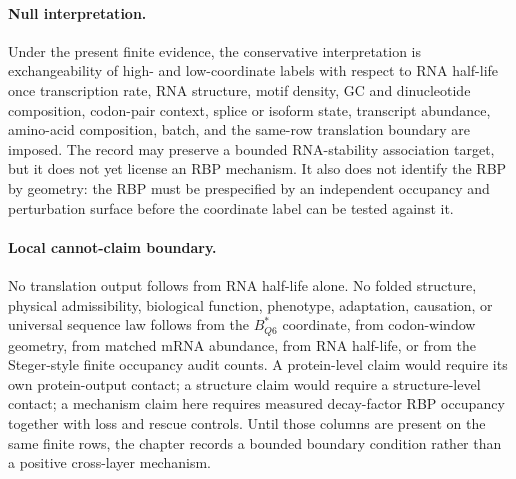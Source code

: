 \paragraph{Null interpretation.}
Under the present finite evidence, the conservative interpretation is exchangeability of high- and low-coordinate labels with respect to RNA half-life once transcription rate, RNA structure, motif density, GC and dinucleotide composition, codon-pair context, splice or isoform state, transcript abundance, amino-acid composition, batch, and the same-row translation boundary are imposed. The record may preserve a bounded RNA-stability association target, but it does not yet license an RBP mechanism. It also does not identify the RBP by geometry: the RBP must be prespecified by an independent occupancy and perturbation surface before the coordinate label can be tested against it.

\paragraph{Local cannot-claim boundary.}
No translation output follows from RNA half-life alone. No folded structure, physical admissibility, biological function, phenotype, adaptation, causation, or universal sequence law follows from the $B^*_{Q6}$ coordinate, from codon-window geometry, from matched mRNA abundance, from RNA half-life, or from the Steger-style finite occupancy audit counts. A protein-level claim would require its own protein-output contact; a structure claim would require a structure-level contact; a mechanism claim here requires measured decay-factor RBP occupancy together with loss and rescue controls. Until those columns are present on the same finite rows, the chapter records a bounded boundary condition rather than a positive cross-layer mechanism.